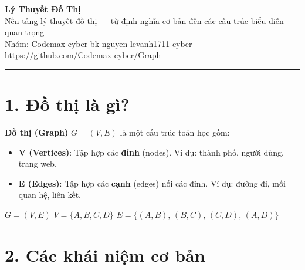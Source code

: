 \documentclass[12pt,a4paper]{article}
\begin{document}
\begin{center}
  {\LARGE\bfseries Lý Thuyết Đồ Thị}\\[0.4em]
  {\large\color{gray} Nền tảng lý thuyết đồ thị --- từ định nghĩa cơ bản đến các cấu trúc biểu diễn quan trọng}\\[0.6em]
  {\small\color{gray} Nhóm: Codemax-cyber \textbullet{} bk-nguyen \textbullet{} levanh1711-cyber}\\
  {\small\color{gray} \url{https://github.com/Codemax-cyber/Graph}}
\end{center}

\vspace{0.5em}
\hrule
\vspace{1.5em}

\section{1. Đồ thị là gì?}

\textbf{Đồ thị (Graph)} $G = (V, E)$ là một cấu trúc toán học gồm:

\begin{itemize}
  \item \textbf{V (Vertices)}: Tập hợp các \textbf{đỉnh} (nodes). Ví dụ: thành phố, người dùng, trang web.
  \item \textbf{E (Edges)}: Tập hợp các \textbf{cạnh} (edges) nối các đỉnh. Ví dụ: đường đi, mối quan hệ, liên kết.
\end{itemize}

\begin{tcolorbox}[colback=boxbg, colframe=teal, fontupper=\ttfamily\small]
$G = (V, E)$ \quad $V = \{A, B, C, D\}$ \quad $E = \{(A,B),\, (B,C),\, (C,D),\, (A,D)\}$
\end{tcolorbox}

\section{2. Các khái niệm cơ bản}
\end{document}
